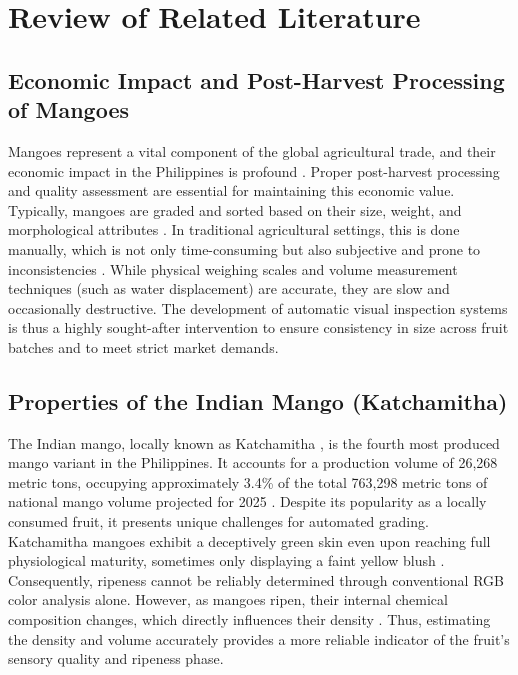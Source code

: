 \section{Review of Related Literature}

\subsection{Economic Impact and Post-Harvest Processing of Mangoes}
Mangoes represent a vital component of the global agricultural trade, and their
economic impact in the Philippines is profound \cite{fernandez2017mango}. Proper
post-harvest processing and quality assessment are essential for maintaining this
economic value. Typically, mangoes are graded and sorted based on their size,
weight, and morphological attributes \cite{Villaruz2025AVA}. In traditional
agricultural settings, this is done manually, which is not only time-consuming
but also subjective and prone to inconsistencies \cite{amdpwe2023}. While physical
weighing scales and volume measurement techniques (such as water displacement)
are accurate, they are slow and occasionally destructive. The development of
automatic visual inspection systems is thus a highly sought-after intervention to
ensure consistency in size across fruit batches and to meet strict market demands.

\subsection{Properties of the Indian Mango (Katchamitha)}
The Indian mango, locally known as Katchamitha \cite{Katchamitha2025}, is the fourth
most produced mango variant in the Philippines. It accounts for a production volume
of 26,268 metric tons, occupying approximately 3.4\% of the total 763,298 metric
tons of national mango volume projected for 2025 \cite{mangoPhilippineOpenStats}.
Despite its popularity as a locally consumed fruit, it presents unique challenges
for automated grading. Katchamitha mangoes exhibit a deceptively green skin even
upon reaching full physiological maturity, sometimes only displaying a faint
yellow blush \cite{Katchamitha20252}. Consequently, ripeness cannot be reliably
determined through conventional RGB color analysis alone. However, as mangoes
ripen, their internal chemical composition changes, which directly influences
their density \cite{fruitDensity}. Thus, estimating the density and volume
accurately provides a more reliable indicator of the fruit's sensory quality and
ripeness phase.

